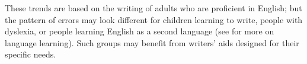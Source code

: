 These trends are based on the writing of adults who are proficient in English; but the pattern of errors may look different for children learning to write,  people with dyslexia, or people learning English as a second language (see  for more on language learning).  Such groups may benefit from writers' aids designed for their specific needs.












